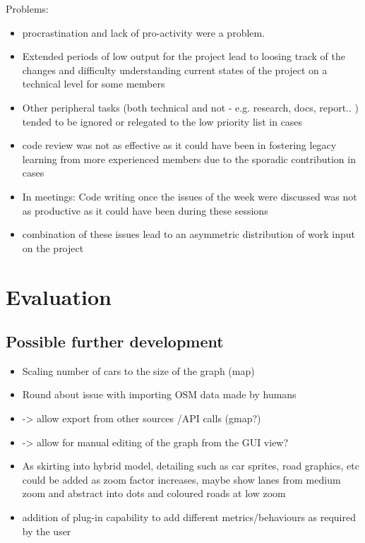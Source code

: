 Problems:
\begin{itemize}
    \item procrastination and lack of pro-activity were a problem.
    \item Extended periods of low output for the project lead to loosing track of the changes and difficulty understanding current states of the project on a technical level for some members
    \item Other peripheral tasks (both technical and not - e.g. research, docs, report.. ) tended to be ignored or relegated to the low priority list in cases
    \item code review was not as effective as it could have been in fostering legacy learning from more experienced members due to the sporadic contribution in cases
    \item In meetings: Code writing once the issues of the week were discussed was not as productive as it could have been during these sessions
    \item combination of these issues lead to an asymmetric distribution of work input on the project
\end{itemize}

\section{Evaluation}
\subsection{Possible further development}
\begin{itemize}
	\item Scaling number of cars to the size of the graph  (map)
	\item Round about issue with importing OSM data made by humans 
	\item -> allow export from other sources /API calls (gmap?)
	\item -> allow for manual editing of the graph from the GUI view?
	\item As skirting into hybrid model, detailing such as car sprites, road graphics, etc could be added as zoom factor increases, maybe show lanes from medium zoom and abstract into dots and coloured roads at low zoom
	\item addition of plug-in capability to add different metrics/behaviours as required by the user
\end{itemize}


